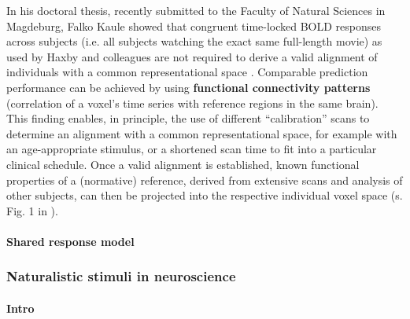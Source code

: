 %
In his doctoral thesis, recently submitted to the Faculty of Natural Sciences in
Magdeburg, Falko Kaule showed that congruent time-locked BOLD responses across
subjects (i.e. all subjects watching the exact same full-length movie) as used
by Haxby and colleagues are not required to derive a valid alignment of
individuals with a common representational space \citep{kaule2017examination}.
%
Comparable prediction performance can be achieved by using \textbf{functional
connectivity patterns} (correlation of a voxel's time series with reference
regions in the same brain).
%
This finding enables, in principle, the use of different ``calibration'' scans
to determine an alignment with a common representational space, for example with
an age-appropriate stimulus, or a shortened scan time to fit into a particular
clinical schedule.
%
Once a valid alignment is established, known functional properties of a
(normative) reference, derived from extensive scans and analysis of other
subjects, can then be projected into the respective individual voxel space (s.
Fig. 1 in \citep{nishimoto2016lining}).


\paragraph{Shared response model}

\citep{chen2015reduced}




\subsubsection{Naturalistic stimuli in neuroscience}



\paragraph{Intro}

